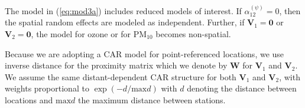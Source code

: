 \documentclass[alpha-refs]{wiley-article}
\newcommand{\bzero}{\textbf{0}}
\newcommand{\bV}{\textbf{V}}
\newcommand{\bW}{\textbf{W}}
\begin{document}
The model in (\ref{eq:mod3a}) includes reduced models of interest.  If $\alpha_{12}^{(\psi)} = 0$, then the spatial random effects are modeled as independent. Further, if $\bV_1 = \bzero$ or $\bV_2 = \bzero$, the model for ozone or for $\text{PM}_{10}$ becomes non-spatial.

Because we are adopting a CAR model for point-referenced locations, we use inverse distance for the proximity matrix which we denote by $\bW$ for $\bV_1$ and $\bV_2$. We assume the same distant-dependent CAR structure for both $\bV_1$ and $\bV_2$, with weights proportional to $\exp(-d/\text{max} d)$ with $d$ denoting the distance between locations and $\text{max} d$ the maximum distance between stations.
\end{document}
